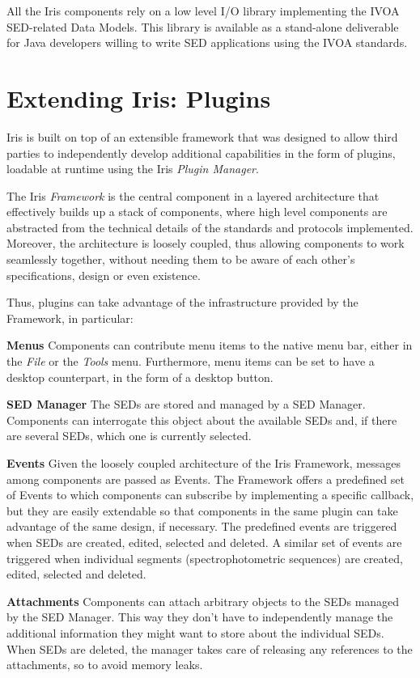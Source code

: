 All the Iris components rely on a low level I/O library implementing the IVOA SED-related Data Models. This library is available as a stand-alone deliverable for Java developers willing to write SED applications using the IVOA standards.

\section{Extending Iris: Plugins}
Iris is built on top of an extensible framework that was designed to allow third parties to independently develop additional capabilities in the form of plugins, loadable at runtime using the Iris \emph{Plugin Manager}.

The Iris \emph{Framework} is the central component in a layered architecture that effectively builds up a stack of components, where high level components are abstracted from the technical details of the standards and protocols implemented. Moreover, the architecture is loosely coupled, thus allowing components to work seamlessly together, without needing them to be aware of each other's specifications, design or even existence.

Thus, plugins can take advantage of the infrastructure provided by the Framework, in particular:

\textbf{Menus}
Components can contribute menu items to the native menu bar, either in the \emph{File} or the \emph{Tools} menu. Furthermore, menu items can be set to have a desktop counterpart, in the form of a desktop button.

\textbf{SED Manager}
The SEDs are stored and managed by a SED Manager. Components can interrogate this object about the available SEDs and, if there are several SEDs, which one is currently selected.

\textbf{Events}
Given the loosely coupled architecture of the Iris Framework, messages among components are passed as Events. The Framework offers a predefined set of Events to which components can subscribe by implementing a specific callback, but they are easily extendable so that components in the same plugin can take advantage of the same design, if necessary. The predefined events are triggered when SEDs are created, edited, selected and deleted. A similar set of events are triggered when individual segments (spectrophotometric sequences) are created, edited, selected and deleted.

\textbf{Attachments}
Components can attach arbitrary objects to the SEDs managed by the SED Manager. This way they don't have to independently manage the additional information they might want to store about the individual SEDs. When SEDs are deleted, the manager takes care of releasing any references to the attachments, so to avoid memory leaks.

